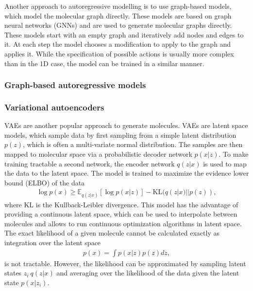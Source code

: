 Another approach to autoregressive modelling is to use graph-based models, which
model the molecular graph directly. These models are based on graph neural
networks (GNNs) and are used to generate molecular graphs directly. 
These models start with an empty graph and iteratively add nodes and edges to
it. At each step the model chooses a modification to apply to the graph and
applies it. While the specification of possible actions is usually more 
complex than in the 1D case, the model can be trained in a similar manner.

\subsubsection{Graph-based autoregressive models}
\subsubsection{Variational autoencoders}
\Acp{VAE} are another popular approach to
generate molecules. \Acp{VAE} are latent space models, which sample 
data by first sampling from a simple latent distribution $p(z)$, which is often 
a multi-variate normal distribution. The samples are then mapped to 
molecular space via a probabilistic decoder network $p(x|z)$.
To make training tractable a second network, the encoder network $q(z|x)$ is
used to map the data to the latent space. The model is trained to maximize
the evidence lower bound (ELBO) of the data
\begin{align}
    \log p(x) \geq \mathbb{E}_{q(z|x)}[\log p(x|z)] - \text{KL}(q(z|x) || p(z)), 
\end{align}
where KL is the Kullback-Leibler divergence. 
This model has the advantage of providing a continuous latent space, which can
be used to interpolate between molecules and allows to run continuous optimization algorithms in
latent space. 
The exact likelihood of a given molecule cannot be calculated exactly
as integration over the latent space
\begin{align}
    p(x) = \int p(x|z) p(z) dz,
\end{align}
is not tractable. However, the likelihood can be approximated 
by sampling latent states $z_i ~ q(z|x)$ and averaging over 
the likelihood of the data given the latent state $p(x|z_i)$.

